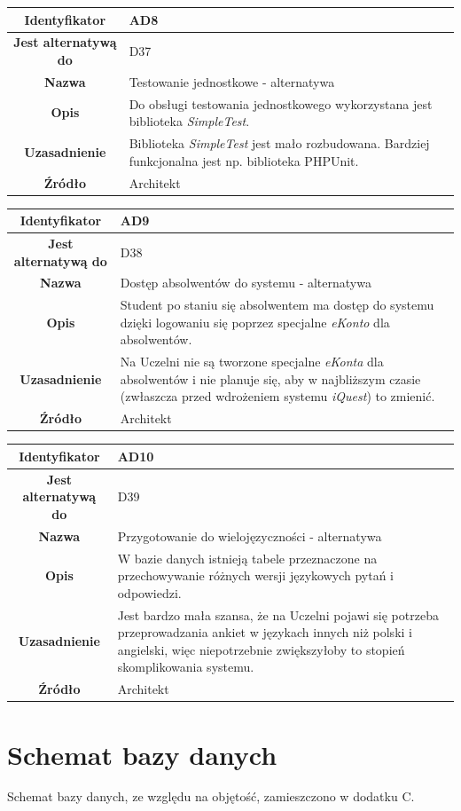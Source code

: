 \begin{table}[H]
\centering
\begin{tabular}{ | >{\bfseries}c | p{11cm} | }
\hline
%
Identyfikator & AD8 \\ \hline
Jest alternatywą do & D37 \\ \hline
Nazwa & Testowanie jednostkowe - alternatywa \\ \hline
Opis & Do obsługi testowania jednostkowego wykorzystana jest biblioteka \textit{SimpleTest}. \\ \hline
Uzasadnienie & Biblioteka \textit{SimpleTest} jest mało rozbudowana. Bardziej funkcjonalna jest np. biblioteka PHPUnit. \\ \hline
Źródło & Architekt \\ \hline
%
\end{tabular}
\end{table}

\begin{table}[H]
\centering
\begin{tabular}{ | >{\bfseries}c | p{11cm} | }
\hline
%
Identyfikator & AD9 \\ \hline
Jest alternatywą do & D38 \\ \hline
Nazwa & Dostęp absolwentów do systemu - alternatywa \\ \hline
Opis & Student po staniu się absolwentem ma dostęp do systemu dzięki logowaniu się poprzez specjalne \textit{eKonto} dla absolwentów. \\ \hline
Uzasadnienie & Na Uczelni nie są tworzone specjalne \textit{eKonta} dla absolwentów i nie planuje się, aby w najbliższym czasie (zwłaszcza przed wdrożeniem systemu \textit{iQuest}) to zmienić. \\ \hline
Źródło & Architekt \\ \hline
%
\end{tabular}
\end{table}

\begin{table}[H]
\centering
\begin{tabular}{ | >{\bfseries}c | p{11cm} | }
\hline
%
Identyfikator & AD10 \\ \hline
Jest alternatywą do & D39 \\ \hline
Nazwa & Przygotowanie do wielojęzyczności - alternatywa \\ \hline
Opis & W bazie danych istnieją tabele przeznaczone na przechowywanie różnych wersji językowych pytań i odpowiedzi. \\ \hline
Uzasadnienie & Jest bardzo mała szansa, że na Uczelni pojawi się potrzeba przeprowadzania ankiet w językach innych niż polski i angielski, więc niepotrzebnie zwiększyłoby to stopień skomplikowania systemu. \\ \hline
Źródło & Architekt \\ \hline
%
\end{tabular}
\end{table}

\section{Schemat bazy danych}
\label{Chapter56}

Schemat bazy danych, ze względu na objętość, zamieszczono w dodatku C.